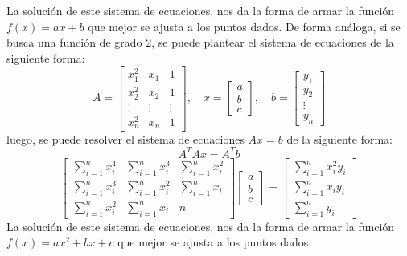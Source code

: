 \documentclass{article}
\begin{document}
La solución de este sistema de ecuaciones, nos da la forma de armar la función $f(x) = ax + b$ que mejor se ajusta a los puntos dados.
De forma análoga, si se busca una función de grado 2, se puede plantear el sistema de ecuaciones de la siguiente forma:
\begin{equation}
    A = \begin{bmatrix}
        x_1^2 & x_1 & 1 \\
        x_2^2 & x_2 & 1 \\
        \vdots & \vdots & \vdots \\
        x_n^2 & x_n & 1
    \end{bmatrix}, \quad x = \begin{bmatrix}
        a \\
        b \\
        c
    \end{bmatrix}, \quad b = \begin{bmatrix}
        y_1 \\
        y_2 \\
        \vdots \\
        y_n
    \end{bmatrix}
\end{equation}
luego, se puede resolver el sistema de ecuaciones $Ax = b$ de la siguiente forma:
\begin{equation}
    A^TAx = A^Tb
\end{equation}
\begin{equation}
    \begin{bmatrix}
        \sum_{i=1}^{n} x_i^4 & \sum_{i=1}^{n} x_i^3 & \sum_{i=1}^{n} x_i^2 \\
        \sum_{i=1}^{n} x_i^3 & \sum_{i=1}^{n} x_i^2 & \sum_{i=1}^{n} x_i \\
        \sum_{i=1}^{n} x_i^2 & \sum_{i=1}^{n} x_i & n
    \end{bmatrix} \begin{bmatrix}
        a \\
        b \\
        c
    \end{bmatrix} = \begin{bmatrix}
        \sum_{i=1}^{n} x_i^2y_i \\
        \sum_{i=1}^{n} x_iy_i \\
        \sum_{i=1}^{n} y_i
    \end{bmatrix}
\end{equation}
La solución de este sistema de ecuaciones, nos da la forma de armar la función $f(x) = ax^2 + bx + c$ que mejor se ajusta a los puntos dados.
\end{document}
